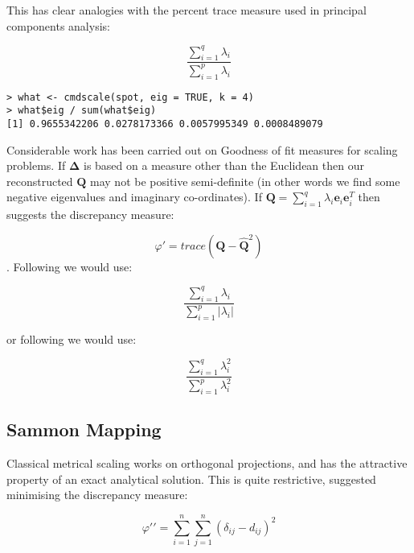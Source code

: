 This has clear analogies with the percent trace measure used in principal components analysis:

\begin{equation}
\frac{\sum_{i=1}^{q} \lambda_{i}}{\sum_{i=1}^{p} \lambda_{i}}
\end{equation}

\singlespacing
\begin{verbatim}
> what <- cmdscale(spot, eig = TRUE, k = 4)
> what$eig / sum(what$eig)
[1] 0.9655342206 0.0278173366 0.0057995349 0.0008489079
\end{verbatim}
\onehalfspacing


Considerable work has been carried out on Goodness of fit measures for scaling problems.   If $\boldsymbol{\Delta}$ is based on a measure other than the Euclidean then our reconstructed $\boldsymbol{Q}$ may not be positive semi-definite (in other words we find some negative eigenvalues and imaginary co-ordinates).   If $\boldsymbol{Q} = \sum_{i=1}^{q} \lambda_{i} \boldsymbol{e}_{i} \boldsymbol{e}_{i}^{T}$ then \cite{Mardia:1978} suggests the discrepancy measure:

\begin{equation}
\varphi \prime = trace(\boldsymbol{Q} - \hat{\boldsymbol{Q}}^{2})
\end{equation}.   Following \cite{Eckart+Young:1936} we would use:

\begin{equation}
\frac{\sum_{i=1}^{q} \lambda_{i}}{\sum_{i=1}^{p} |\lambda_{i}|}
\end{equation}

or following \cite{Mardia:1978} we would use:

\begin{equation}
\frac{\sum_{i=1}^{q} \lambda_{i}^{2}}{\sum_{i=1}^{p} \lambda_{i}^{2}}
\end{equation}


\subsection{Sammon Mapping}

Classical metrical scaling works on orthogonal projections, and has the attractive property of an exact analytical solution.   This is quite restrictive, \cite{Sammon:1969} suggested minimising the discrepancy measure:

\begin{displaymath}
\varphi \prime \prime =  \sum_{i=1}^{n} \sum_{j=1}^{n} (\delta_{ij} - d_{ij})^{2}
\end{displaymath}

